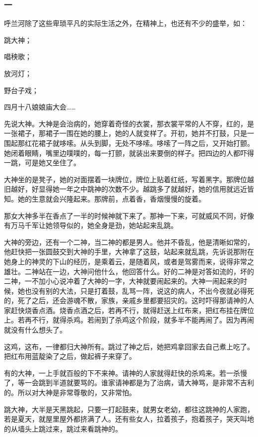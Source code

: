 \subsubsection*{一}
\par 呼兰河除了这些卑琐平凡的实际生活之外，在精神上，也还有不少的盛举，如：
\par 跳大神；
\par 唱秧歌；
\par 放河灯；
\par 野台子戏；
\par 四月十八娘娘庙大会……
\par 先说大神。大神是会治病的，她穿着奇怪的衣裳，那衣裳平常的人不穿，红的，是一张裙子，那裙子一围在她的腰上，她的人就变样了。开初，她并不打鼓，只是一围起那红花裙子就哆嗦。从头到脚，无处不哆嗦。哆嗦了一阵之后，又开始打颤。她闭着眼睛，嘴里边噗噗的，每一打颤，就装出来要倒的样子。把四边的人都吓得一跳，可是她又坐住了。
\par 大神坐的是凳子，她的对面摆着一块牌位，牌位上贴着红纸，写着黑字。那牌位越旧越好，好显得她一年之中跳神的次数不少。越跳多了就越好，她的信用就远近皆知。她的生意就会兴隆起来。那牌前，点着香，香烟慢慢的旋着。
\par 那女大神多半在香点了一半的时候神就下来了。那神一下来，可就威风不同，好像有万马千军让她领导似的，她全身是劲，她站起来乱跳。
\par 大神的旁边，还有一个二神，当二神的都是男人。他并不昏乱，他是清晰如常的，他赶快把一张圆鼓交到大神的手里，大神拿了这鼓，站起来就乱跳，先诉说那附在她身上的神灵的下山的经历，是乘着云，是随着风，或者是驾雾而来，说得非常之雄壮。二神站在一边，大神问他什么，他回答什么。好的二神是对答如流的，坏的二神，一不加小心说冲着了大神的一字，大神就要闹起来的。大神一闹起来的时候，她也没有别的大法，只是打着鼓，乱骂一阵，说这的病人，不出今夜就必得死的，死了之后，还会游魂不散，家族，亲戚乡里都要招灾的。这时吓得那请神的人家赶快烧香点酒。烧香点酒之后，若再不行，就得赶送上红布来，把红布挂在牌位上。若再不行，就得杀鸡。若闹到了杀鸡这个阶段，就多半不能再闹了。因为再闹就没有什么想头了。
\par 这鸡，这布，一律都归大神所有。跳过了神之后，她把鸡拿回家去自己煮上吃了。把红布用蓝靛染了之后，做起裤子来穿了。
\par 有的大神，一上手就百般的下不来神。请神的人家就得赶快的杀鸡来。若一杀慢了，等一会跳到半道就要骂的。谁家请神都是为了治病，请大神骂，是非常不吉利的。所以对大神是非常尊敬的，又非常怕。
\par 跳大神，大半是天黑跳起，只要一打起鼓来，就男女老幼，都往这跳神的人家跑，若是夏天，就屋里屋外都挤满了人。还有些女人，拉着孩子，抱着孩子，哭天叫地的从墙头上跳过来，跳过来看跳神的。
